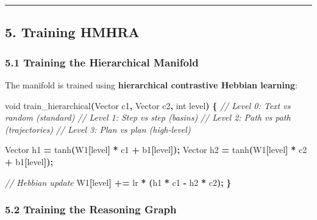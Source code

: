 \documentclass[
  11pt,
  a4paper,
]{article}
\newenvironment{Shaded}{\begin{snugshade}}{\end{snugshade}}
\newcommand{\CommentTok}[1]{\textcolor[rgb]{0.56,0.35,0.01}{\textit{#1}}}
\newcommand{\DataTypeTok}[1]{\textcolor[rgb]{0.13,0.29,0.53}{#1}}
\newcommand{\NormalTok}[1]{#1}
\newcommand{\OperatorTok}[1]{\textcolor[rgb]{0.81,0.36,0.00}{\textbf{#1}}}
\begin{document}
\begin{center}\rule{0.5\linewidth}{0.5pt}\end{center}

\subsection{5. Training HMHRA}\label{training-hmhra}

\subsubsection{5.1 Training the Hierarchical
Manifold}\label{training-the-hierarchical-manifold}

The manifold is trained using \textbf{hierarchical contrastive Hebbian
learning}:

\begin{Shaded}
\begin{Highlighting}[]
\DataTypeTok{void}\NormalTok{ train\_hierarchical}\OperatorTok{(}\NormalTok{Vector c1}\OperatorTok{,}\NormalTok{ Vector c2}\OperatorTok{,} \DataTypeTok{int}\NormalTok{ level}\OperatorTok{)} \OperatorTok{\{}
    \CommentTok{// Level 0: Text vs random (standard)}
    \CommentTok{// Level 1: Step vs step (basins)}
    \CommentTok{// Level 2: Path vs path (trajectories)}
    \CommentTok{// Level 3: Plan vs plan (high{-}level)}
    
\NormalTok{    Vector h1 }\OperatorTok{=}\NormalTok{ tanh}\OperatorTok{(}\NormalTok{W1}\OperatorTok{[}\NormalTok{level}\OperatorTok{]} \OperatorTok{*}\NormalTok{ c1 }\OperatorTok{+}\NormalTok{ b1}\OperatorTok{[}\NormalTok{level}\OperatorTok{]);}
\NormalTok{    Vector h2 }\OperatorTok{=}\NormalTok{ tanh}\OperatorTok{(}\NormalTok{W1}\OperatorTok{[}\NormalTok{level}\OperatorTok{]} \OperatorTok{*}\NormalTok{ c2 }\OperatorTok{+}\NormalTok{ b1}\OperatorTok{[}\NormalTok{level}\OperatorTok{]);}
    
    \CommentTok{// Hebbian update}
\NormalTok{    W1}\OperatorTok{[}\NormalTok{level}\OperatorTok{]} \OperatorTok{+=}\NormalTok{ lr }\OperatorTok{*} \OperatorTok{(}\NormalTok{h1 }\OperatorTok{*}\NormalTok{ c1 }\OperatorTok{{-}}\NormalTok{ h2 }\OperatorTok{*}\NormalTok{ c2}\OperatorTok{);}
\OperatorTok{\}}
\end{Highlighting}
\end{Shaded}

\subsubsection{5.2 Training the Reasoning
Graph}\label{training-the-reasoning-graph}
\end{document}
